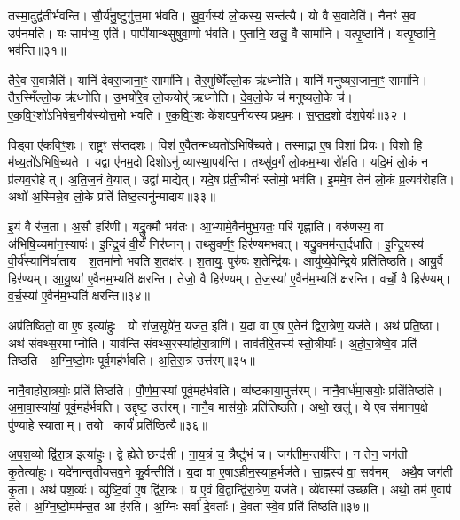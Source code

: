 तस्मा॒दुद्व॑तीर्भवन्ति।
सौ॒र्य॑नु॒ष्टुगु॑त्त॒मा भ॑वति।
सु॒व॒र्गस्य॑ लो॒कस्य॒ सन्त॑त्यै।
यो वै स॒वादेति॑।
नैनꣳ॑ स॒व उप॑नमति।
यः साम॑भ्य॒ एति॑।
पापी॑यान्थ्सुषुवा॒णो भ॑वति।
ए॒तानि॒ खलु॒ वै सामा॑नि।
यत्पृ॒ष्ठानि॑।
यत्पृ॒ष्ठानि॒ भव॑न्ति॥३१॥

तैरे॒व स॒वान्नैति॑।
यानि॑ देवरा॒जाना॒ꣳ॒ सामा॑नि।
तैर॒मुष्मिँ॑ल्लो॒क ऋ॑ध्नोति।
यानि॑ मनुष्यरा॒जाना॒ꣳ॒ सामा॑नि।
तैर॒स्मिँल्लो॒क ऋ॑ध्नोति।
उ॒भयो॑रे॒व लो॒कयोर्॑ ऋध्नोति।
दे॒व॒लो॒के च॑ मनुष्यलो॒के च॑।
ए॒क॒वि॒ꣳ॒शो॑\-ऽभिषेच॒नीय॑स्योत्त॒मो भ॑वति।
ए॒क॒वि॒ꣳ॒शः के॑शवप॒नीय॑स्य प्रथ॒मः।
स॒प्त॒द॒शो द॑श॒पेयः॑॥३२॥

विड्वा ए॑कवि॒ꣳ॒शः।
रा॒ष्ट्रꣳ स॑प्तद॒शः।
विश॑ ए॒वैतन्म॑ध्य॒तो॑\-ऽभिषि॑च्यते।
तस्मा॒द्वा ए॒ष वि॒शां प्रि॒यः।
वि॒शो हि म॑ध्य॒तो॑\-ऽभिषि॒च्यते।
यद्वा ए॑नम॒दो दिशोऽनु॑ व्यास्था॒पय॑न्ति।
तथ्सु॑व॒र्गं लो॒कम॒भ्या रो॑हति।
यदि॒मं लो॒कं न प्र॑त्यव॒रोहेत्।
अ॒ति॒ज॒नं वे॒यात्।
उद्वा॑ माद्येत्।
यदे॒ष प्र॑ती॒चीनः॑ स्तोमो॒ भव॑ति।
इ॒ममे॒व तेन॑ लो॒कं प्र॒त्यव॑रोहति।
अथो॑ अ॒स्मिन्ने॒व लो॒के प्रति॑ तिष्ठ॒त्यनु॑न्मादाय॥३३॥\anuvakamend[अक्र॑न्राज॒न्यो॑ भव॑न्ति दश॒पेयो॑ माद्ये॒त्त्रीणि॑ च]

इ॒यं वै र॑ज॒ता।
अ॒सौ हरि॑णी।
यद्रु॒क्मौ भव॑तः।
आ॒भ्यामे॒वैन॑मुभ॒यतः॒ परि॑ गृह्णाति।
वरु॑णस्य॒ वा अ॑भिषि॒च्यमा॑न॒स्यापः॑।
इ॒न्द्रि॒यं वी॒र्यं॑ निर॑घ्नन्।
तथ्सु॒वर्ण॒ꣳ॒ हिर॑ण्यमभवत्।
यद्रु॒क्मम॑न्त॒र्दधा॑ति।
इ॒न्द्रि॒यस्य॑ वी॒र्य॑स्या\-नि॑र्घाताय।
श॒तमा॑नो भवति श॒तक्ष॑रः।
श॒तायुः॒ पुरु॑षः श॒तेन्द्रि॑यः।
आयु॑ष्ये॒वेन्द्रि॒ये प्रति॑तिष्ठति।
आयु॒र्वै हिर॑ण्यम्।
आ॒यु॒ष्या॑ ए॒वैन॑म॒भ्यति॑ क्षरन्ति।
तेजो॒ वै हिर॑ण्यम्।
ते॒ज॒स्या॑ ए॒वैन॑म॒भ्यति॑ क्षरन्ति।
वर्चो॒ वै हिर॑ण्यम्।
व॒र्च॒स्या॑ ए॒वैन॑म॒भ्यति॑ क्षरन्ति॥३४॥\anuvakamend[श॒तक्ष॑रो॒\-ऽष्टौ च॑]

अप्र॑तिष्ठितो॒ वा ए॒ष इत्या॑हुः।
यो रा॑ज॒सूये॑न॒ यज॑त॒ इति॑।
य॒दा वा ए॒ष ए॒तेन॑ द्विरा॒त्रेण॒ यज॑ते।
अथ॑ प्रति॒ष्ठा।
अथ॑ संवथ्स॒रमाप्नोति।
याव॑न्ति संवथ्स॒रस्या॑होरा॒त्राणि॑।
ताव॑तीरे॒तस्य॑ स्तो॒त्रीयाः᳚।
अ॒हो॒रा॒त्रेष्वे॒व प्रति॑ तिष्ठति।
अ॒ग्नि॒ष्टो॒मः पूर्व॒मह॑र्भवति।
अ॒ति॒रा॒त्र उत्त॑रम्॥३५॥

नानै॒वाहो॑रा॒त्रयोः॒ प्रति॑ तिष्ठति।
पौ॒र्ण॒मा॒स्यां पूर्व॒मह॑र्भवति।
व्य॑ष्टकाया॒मुत्त॑रम्।
नानै॒वार्ध॑मा॒सयोः॒ प्रति॑तिष्ठति।
अ॒मा॒वा॒स्या॑यां॒ पूर्व॒मह॑र्भवति।
उद्दृ॑ष्ट॒ उत्त॑रम्।
नानै॒व मास॑योः॒ प्रति॑तिष्ठति।
अथो॒ खलु॑।
ये ए॒व स॑मानप॒क्षे पु॑ण्या॒हे स्याताम्।
तयो का॒र्यं॑ प्रति॑ष्ठित्यै॥३६॥

अ॒प॒श॒व्यो द्वि॑रा॒त्र इत्या॑हुः।
द्वे ह्ये॑ते छन्द॑सी।
गा॒य॒त्रं च॒ त्रैष्टु॑भं च।
जग॑तीम॒न्तर्य॑न्ति।
न तेन॒ जग॑ती कृ॒तेत्या॑हुः।
यदे॑नान्तृतीयसव॒ने कु॒र्वन्तीति॑।
य॒दा वा ए॒षा\-ऽहीन॒स्याह॒र्भज॑ते।
सा॒ह्नस्य॑ वा॒ सव॑नम्।
अथै॒व जग॑ती कृ॒ता।
अथ॑ पश॒व्यः॑।
व्यु॑ष्टि॒र्वा ए॒ष द्वि॑रा॒त्रः।
य ए॒वं वि॒द्वान्द्वि॑रा॒त्रेण॒ यज॑ते।
व्ये॑वास्मा॑ उच्छति।
अथो॒ तम॑ ए॒वाप॑ हते।
अ॒ग्नि॒ष्टो॒मम॑न्त॒त आ ह॑रति।
अ॒ग्निः सर्वा॑ दे॒वताः᳚।
दे॒वतास्वे॒व प्रति॑ तिष्ठति॥३७॥\anuvakamend[उत्त॑रं॒ प्रति॑ष्ठित्यै पश॒व्यः॑ स॒प्त च॑]

